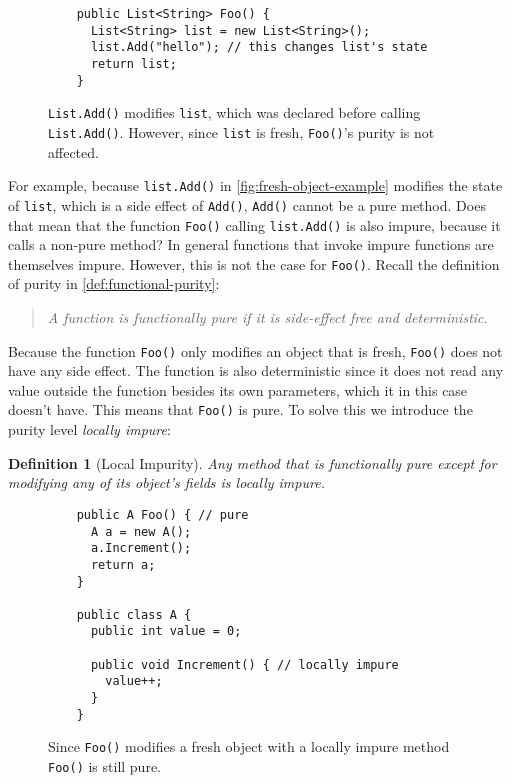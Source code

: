 \documentclass[a4paper,12pt]{article}
\newtheorem{definition}{Definition} %
\begin{document}
\begin{figure}
  \centering
  \begin{lstlisting}
    public List<String> Foo() {
      List<String> list = new List<String>();
      list.Add("hello"); // this changes list's state
      return list;
    }
  \end{lstlisting}
  \caption{\texttt{List.Add()} modifies \texttt{list}, which was declared before calling \texttt{List.Add()}. However, since \texttt{list} is fresh, \texttt{Foo()}'s purity is not affected.}
  \label{fig:fresh-object-example}
\end{figure}

For example, because \texttt{list.Add()} in \autoref{fig:fresh-object-example} modifies the state of \texttt{list}, which is a side effect of \texttt{Add()}, \texttt{Add()} cannot be a pure method. Does that mean that the function \texttt{Foo()} calling \texttt{list.Add()} is also impure, because it calls a non-pure method? In general functions that invoke impure functions are themselves impure. However, this is not the case for \texttt{Foo()}. Recall the definition of purity in \autoref{def:functional-purity}:

\begin{quote}
  \textit{A function is functionally pure if it is side-effect free and deterministic}.
\end{quote}

Because the function \texttt{Foo()} only modifies an object that is fresh, \texttt{Foo()} does not have any side effect. The function is also deterministic since it does not read any value outside the function besides its own parameters, which it in this case doesn't have. This means that \texttt{Foo()} is pure. To solve this we introduce the purity level \textit{locally impure}:

\begin{definition}[Local Impurity] \label{def:locally-impure}
  Any method that is functionally pure except for modifying any of its object's fields is locally impure.
\end{definition}

\begin{figure}[H]
  \centering
  \begin{lstlisting}
    public A Foo() { // pure
      A a = new A();
      a.Increment();
      return a;
    }

    public class A {
      public int value = 0;

      public void Increment() { // locally impure
        value++;
      }
    }
  \end{lstlisting}
  \caption{Since \texttt{Foo()} modifies a fresh object with a locally impure method \texttt{Foo()} is still pure.}
  \label{fig:locally-impure-example}
\end{figure}
\end{document}
